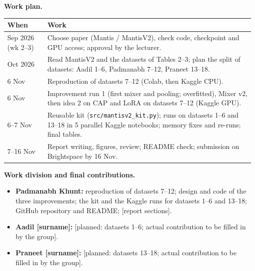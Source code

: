 \documentclass[conference]{IEEEtran}
\begin{document}

\textbf{Work plan.}

\smallskip
\noindent\footnotesize
\begin{tabular}{@{}p{}p{}@{}}
\toprule
When & Work \\
\midrule
Sep 2026 (wk 2--3) & Choose paper (Mantis / MantisV2), check code, checkpoint and GPU access; approval by the lecturer. \\
Oct 2026 & Read MantisV2 and the datasets of Tables 2--3; plan the split of datasets: Aadil 1--6, Padmanabh 7--12,
Praneet 13--18. \\
6 Nov & Reproduction of datasets 7--12 (Colab, then Kaggle CPU). \\
6 Nov & Improvement run 1 (first mixer and pooling; overfitted), Mixer v2, then idea 2 on CAP and LoRA on datasets
7--12 (Kaggle GPU). \\
6--7 Nov & Reusable kit (\texttt{src/mantisv2\_kit.py}); runs on datasets 1--6 and 13--18 in 5 parallel Kaggle notebooks; memory fixes
and re-runs; final tables. \\
7--16 Nov & Report writing, figures, review; README check; submission on Brightspace by 16 Nov. \\
\bottomrule
\end{tabular}
\normalsize

\medskip
\textbf{Work division and final contributions.}
\begin{itemize}
\item \textbf{Padmanabh Khunt:} reproduction of datasets 7--12; design and code of the three improvements; the
kit and the Kaggle runs for datasets 1--6 and 13--18; GitHub repository and README; [report sections].
\item \textbf{Aadil [surname]:} [planned: datasets 1--6; actual contribution to be filled in by the group].
\item \textbf{Praneet [surname]:} [planned: datasets 13--18; actual contribution to be filled in by the group].
\end{itemize}
\end{document}
